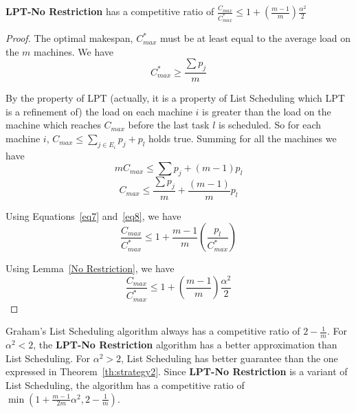 \documentclass[twocolumn]{svjour3}
\begin{document}
\begin{theorem}
  \label{th:strategy2}
  \textbf{LPT-No Restriction} has a competitive ratio of
  $\frac{C_{max}}{C_{max}^{*}} \leq 1 + (\frac{m-1}{m})
  \frac{\alpha^{2}}{2}$
\end{theorem} 

\begin{proof}
  The optimal makespan, $C_{max}^{*}$ must be at least equal to the
  average load on the $m$ machines. We have
  \begin{equation}\label{eq7}
    C_{max}^{*}\geq\frac{\sum p_j}{m}
  \end{equation}

  By the property of LPT (actually, it is a property of List
  Scheduling which LPT is a refinement of) the load on each machine
  $i$ is greater than the load on the machine which reaches $C_{max}$
  before the last task $l$ is scheduled. So for each machine $i$,
  $C_{max} \leq \sum_{j \in E_i}^{}{p_j} + p_l$ holds true.  Summing
  for all the machines we have
  \begin{equation}\nonumber
    mC_{max} \leq  \sum {p_j} + (m-1)p_l
  \end{equation}
  \begin{equation}\label{eq8}
    C_{max} \leq  \frac{\sum {p_j}}{m} + \frac{(m-1)}{m}p_l
  \end{equation}
  
  Using Equations~\ref{eq7} and~\ref{eq8}, we have
  \begin{equation}\nonumber
    \frac{C_{max}}{C_{max}^{*}} \leq 1 + {\frac{m-1}{m}}\left(\frac{p_l}{C_{max}^{*}}\right)
  \end{equation}
  
  Using Lemma~\ref{No Restriction}, we have 
  \begin{equation}\nonumber
    \frac{C_{max}}{C_{max}^{*}} \leq 1 + \left(\frac{m-1}{m}\right)\frac{\alpha^{2}}{2}
  \end{equation}

\end{proof}  

Graham's List Scheduling algorithm always has a competitive ratio
of $2-\frac{1}{m}$. For $\alpha^2 < 2$, the \textbf{LPT-No
  Restriction} algorithm has a better approximation than List
Scheduling. For $\alpha^2 > 2$, List Scheduling has better guarantee
than the one expressed in Theorem~\ref{th:strategy2}. Since
\textbf{LPT-No Restriction} is a variant of List Scheduling,
the algorithm has a competitive ratio of $\min (1 +
\frac{m-1}{2m}\alpha^{2}, 2-\frac{1}{m})$.
\end{document}
